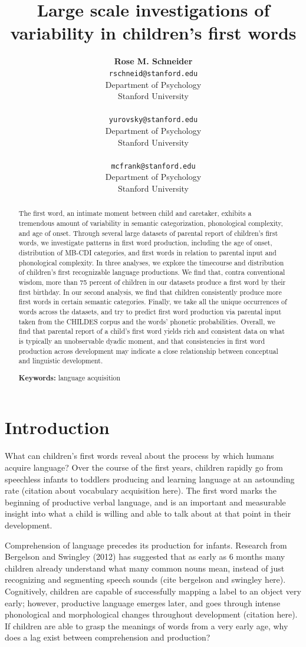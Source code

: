 \documentclass[10pt,letterpaper]{article}
\title{Large scale investigations of variability in children's first words}
\author{{\large \bf Rose M. Schneider} \\ \texttt{rschneid@stanford.edu}\\ Department of Psychology \\ Stanford University \\ 
\And {\large \bf Daniel Yurovsky} \\ \texttt{yurovsky@stanford.edu} \\ Department of Psychology \\ Stanford University \\ 
\And {\large \bf Michael C. Frank} \\ \texttt{mcfrank@stanford.edu} \\ Department of Psychology \\ Stanford University \\ }
\begin{document}
\maketitle


\begin{abstract}
The first word, an intimate moment between child and caretaker, exhibits a tremendous amount of variability in semantic categorization, phonological complexity, and age of onset. Through several large datasets of parental report of children's first words, we investigate patterns in first word production, including the age of onset, distribution of MB-CDI categories, and first words in relation to parental input and phonological complexity. In three analyses, we explore the timecourse and distribution of children's first recognizable language productions. We find that, contra conventional wisdom, more than 75 percent of children in our datasets produce a first word by their first birthday. In our second analysis, we find that children consistently produce more first words in certain semantic categories. Finally, we take all the unique occurrences of words across the datasets, and try to predict first word production via parental input taken from the CHILDES corpus and the words' phonetic probabilities. Overall, we find that parental report of a child's first word yields rich and consistent data on what is typically an unobservable dyadic moment, and that consistencies in first word production across development may indicate a close relationship between conceptual and linguistic development.

\textbf{Keywords:}
language acquisition
\end{abstract}

\section{Introduction}
What can children's first words reveal about the process by which humans acquire language? Over the course of the first years, children rapidly go from speechless infants to toddlers producing and learning language at an astounding rate (citation about vocabulary acquisition here). The first word marks the beginning of productive verbal language, and is an important and measurable insight into what a child is willing and able to talk about at that point in their development. 

Comprehension of language precedes its production for infants. Research from Bergelson and Swingley (2012) has suggested that as early as 6 months many children already understand what many common nouns mean, instead of just recognizing and segmenting speech sounds (cite bergelson and swingley here). Cognitively, children are capable of successfully mapping a label to an object very early; however, productive language emerges later, and goes through intense phonological and morphological changes throughout development (citation here). If children are able to grasp the meanings of words from a very early age, why does a lag exist between comprehension and production?
\end{document}
